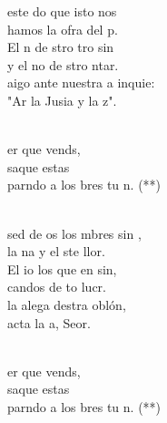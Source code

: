 \begin{cancion}%
	 este do que isto nos \\
	hamos la ofra del p. \\
	El n de stro tro sin \\
	y el no de stro ntar.\\
	aigo ante nuestra a inquie:\\
	"Ar la Jusia y la z".\\\jump\\
	\begin{chorus}%
	er que vends, \\
	saque estas\\
	parndo a los bres tu n. (**)\\
	\end{chorus}%
	\jump\\
	 sed de os los mbres sin ,\\
	la na y el ste llor. \\
	El io los que en sin,\\
	candos de to lucr.\\
	 la alega destra oblón,\\
	acta la a, Seor.\\\jump\\
	\begin{chorus}%
	er que vends, \\
	saque estas\\
	parndo a los bres tu n. (**)\\
	\end{chorus}%
	\jump\\
\end{cancion}%
